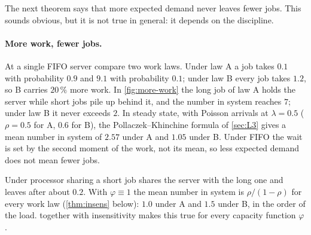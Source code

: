 The next theorem says that more expected demand never leaves fewer jobs. This sounds
obvious, but it is not true in general: it depends on the discipline.

\paragraph{More work, fewer jobs.} At a single FIFO server compare two work laws. Under
law A a job takes $0.1$ with probability $0.9$ and $9.1$ with probability $0.1$; under
law B every job takes $1.2$, so B carries $20\,\%$ more work. In \cref{fig:more-work}
the long job of law A holds the server while short jobs pile up behind it, and the
number in system reaches $7$; under law B it never exceeds $2$. In steady state, with
Poisson arrivals at $\lambda=0.5$ ($\rho=0.5$ for A, $0.6$ for B), the
Pollaczek--Khinchine formula of \cref{sec:L3} gives a mean number in system of $2.57$
under A and $1.05$ under B. Under FIFO the wait is set by the second moment of the work,
not its mean, so less expected demand does not mean fewer jobs.

Under processor sharing a short job shares the server with the long one and leaves
after about $0.2$. With $\varphi\equiv1$ the mean number in system is $\rho/(1-\rho)$
for every work law (\cref{thm:insens} below): $1.0$ under A and $1.5$ under B, in the
order of the load.  together with insensitivity makes this true for
every capacity function $\varphi$.

